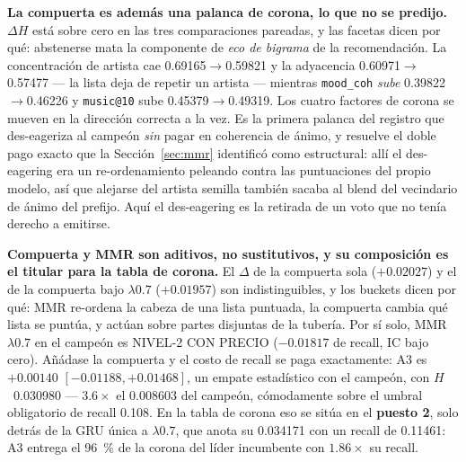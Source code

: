 \documentclass[11pt]{article}
\begin{document}
\textbf{La compuerta es además una palanca de corona, lo que no se predijo.}
$\Delta H$ está sobre cero en las tres comparaciones pareadas, y las facetas dicen
por qué: abstenerse mata la componente de \emph{eco de bigrama} de la
recomendación. La concentración de artista cae
\num{0.69165}$\to$\num{0.59821} y la adyacencia
\num{0.60971}$\to$\num{0.57477} --- la lista deja de repetir un artista --- mientras
\texttt{mood\_coh} \emph{sube} \num{0.39822}$\to$\num{0.46226} y
\texttt{music@10} sube \num{0.45379}$\to$\num{0.49319}. Los cuatro factores de
corona se mueven en la dirección correcta a la vez. Es la primera palanca del
registro que des-eageriza al campeón \emph{sin} pagar en coherencia de ánimo, y
resuelve el doble pago exacto que la Sección~\ref{sec:mmr} identificó como
estructural: allí el des-eagering era un re-ordenamiento peleando contra las
puntuaciones del propio modelo, así que alejarse del artista semilla también sacaba
al blend del vecindario de ánimo del prefijo. Aquí el des-eagering es la retirada de
un voto que no tenía derecho a emitirse.

\textbf{Compuerta y MMR son aditivos, no sustitutivos, y su composición es el
titular para la tabla de corona.} El $\Delta$ de la compuerta sola
($+\num{0.02027}$) y el de la compuerta bajo $\lambda\num{0.7}$
($+\num{0.01957}$) son indistinguibles, y los buckets dicen por qué: MMR
re-ordena la cabeza de una lista puntuada, la compuerta cambia qué lista se
puntúa, y actúan sobre partes disjuntas de la tubería. Por sí solo, MMR
$\lambda\num{0.7}$ en el campeón es NIVEL-2 CON PRECIO ($-\num{0.01817}$ de
recall, IC bajo cero). Añádase la compuerta y el costo de recall se paga
exactamente: A3 es $+\num{0.00140}$ $[-\num{0.01188}, +\num{0.01468}]$, un empate
estadístico con el campeón, con $H$~\num{0.030980} --- $\num{3.6}\times$ el
\num{0.008603} del campeón, cómodamente sobre el umbral obligatorio de recall
\num{0.108}. En la tabla de corona eso se sitúa en el \textbf{puesto 2}, solo
detrás de la GRU única a $\lambda\num{0.7}$, que anota su \num{0.034171} con un
recall de \num{0.11461}: A3 entrega el \SI{96}{\percent} de la corona del líder
incumbente con $\num{1.86}\times$ su recall.
\end{document}
